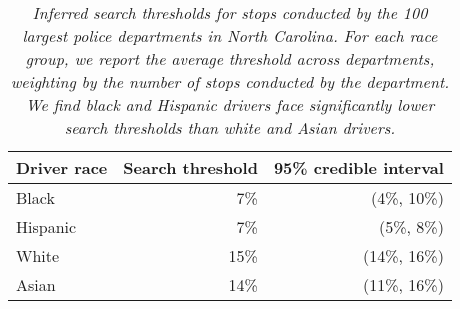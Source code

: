 \begin{table}[ht]
\centering
\begin{tabular}{lrr}
  \toprule
Driver race & Search threshold & 95\% credible interval \\ 
  \midrule
Black & 7\% & (4\%, 10\%) \\ 
  Hispanic & 7\% & (5\%, 8\%) \\ 
  White & 15\% & (14\%, 16\%) \\ 
  Asian & 14\% & (11\%, 16\%) \\ 
   \bottomrule
\end{tabular}
\caption{\emph{Inferred search thresholds for stops conducted by the 100 largest police departments in North Carolina. For each race group, we report the average threshold across departments, weighting by the number of stops conducted by the department. We find black and Hispanic drivers face significantly lower search thresholds than white and Asian drivers.}} 
\label{tab:threshold_results}
\end{table}
